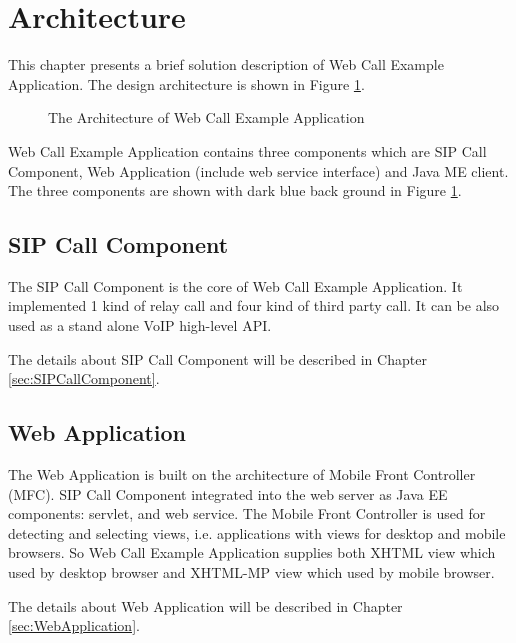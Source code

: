 \section{Architecture}
\label{sec:ApplicationOverview:ArchitectureOverview}

This chapter presents a brief solution description of Web Call Example Application. The design architecture is shown in Figure \ref{fig:ArchitectureOfWebCallExampleApplication}.

\begin{figure}[!hbtp]
\centering
{}
\caption{The Architecture of Web Call Example Application}
\label{fig:ArchitectureOfWebCallExampleApplication}
\end{figure}

Web Call Example Application contains three components which are SIP Call Component, Web Application (include web service interface) and Java ME client. The three components are shown with dark blue back ground in Figure \ref{fig:ArchitectureOfWebCallExampleApplication}.

\subsection{SIP Call Component}

The SIP Call Component is the core of Web Call Example Application. It implemented 1 kind of relay call and four kind of third party call. It can be also used as a stand alone VoIP high-level API. 

The details about SIP Call Component will be described in Chapter \ref{sec:SIPCallComponent}.

\subsection{Web Application}

The Web Application is built on the architecture of Mobile Front Controller (MFC). SIP Call Component integrated into the web server as Java EE components: servlet, and web service. The Mobile Front Controller is used for detecting and selecting views, i.e. applications with views for desktop and mobile browsers. So Web Call Example Application supplies both XHTML view which used by desktop browser and XHTML-MP view which used by mobile browser. 

The details about Web Application will be described in Chapter \ref{sec:WebApplication}.


